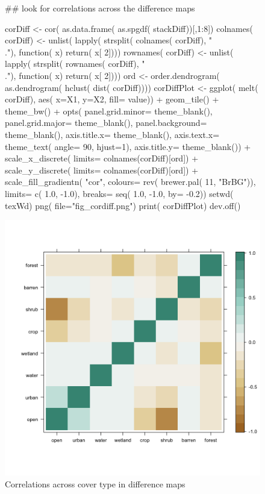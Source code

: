 \begin{figure} 
\begin{center} 

\begin{Schunk}
\begin{Sinput}
 ## look for correlations across the difference maps
 
 corDiff <- cor( as.data.frame( as.spgdf( stackDiff))[,1:8])
 colnames( corDiff) <- unlist( lapply( 
                                      strsplit( colnames( corDiff), "\\."), 
                                      function( x) return( x[ 2])))
 rownames( corDiff) <- unlist( lapply( 
                                      strsplit( rownames( corDiff), "\\."), 
                                      function( x) return( x[ 2])))
 ord <- order.dendrogram( as.dendrogram( hclust( dist( corDiff))))
 corDiffPlot <- 
   ggplot( melt( corDiff),
          aes( x=X1, y=X2, fill= value)) +
   geom_tile() +
   theme_bw() +
   opts( panel.grid.minor= theme_blank(),
        panel.grid.major= theme_blank(),
        panel.background= theme_blank(),
        axis.title.x= theme_blank(),
        axis.text.x= theme_text( angle= 90, hjust=1),
        axis.title.y= theme_blank()) +
   scale_x_discrete( limits= colnames(corDiff)[ord]) +
   scale_y_discrete( limits= colnames(corDiff)[ord]) +
   scale_fill_gradientn( "cor", colours= rev( brewer.pal( 11, "BrBG")), 
                        limits= c( 1.0, -1.0),
                        breaks= seq( 1.0, -1.0, by= -0.2))
 setwd( texWd)
 png( file="fig_cordiff.png")
 print( corDiffPlot)
 dev.off()
\end{Sinput}
\end{Schunk}
\includegraphics{fig_cordiff}
\end{center} 
\caption{Correlations across cover type in difference maps} 
\label{fig:cordiff} 
\end{figure} 

